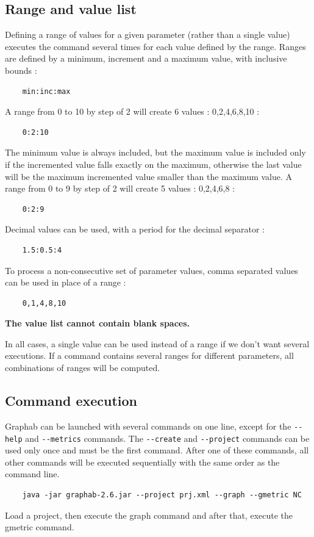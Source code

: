 \documentclass[a4paper,10pt]{report}
\begin{document}
\subsection{Range and value list}
Defining a range of values for a given parameter (rather than a single value) executes the command several times for each value defined by the range.
Ranges are defined by a minimum, increment and a maximum value, with inclusive bounds :
\begin{Verbatim}
	min:inc:max
\end{Verbatim}
A range from 0 to 10 by step of 2 will create 6 values : 0,2,4,6,8,10 :
\begin{Verbatim}
	0:2:10
\end{Verbatim}
The minimum value is always included, but the maximum value is included only if the incremented value falls exactly on the maximum, 
otherwise the last value will be the maximum incremented value smaller than the maximum value.
A range from 0 to 9 by step of 2 will create 5 values : 0,2,4,6,8 :
\begin{Verbatim}
	0:2:9
\end{Verbatim}
Decimal values can be used, with a period for the decimal separator : 
\begin{Verbatim}
	1.5:0.5:4
\end{Verbatim}
To process a non-consecutive set of parameter values, comma separated values can be used in place of a range :
\begin{Verbatim}
	0,1,4,8,10
\end{Verbatim}
\textbf{The value list cannot contain blank spaces.}

In all cases, a single value can be used instead of a range if we don't want several executions.
If a command contains several ranges for different parameters, all combinations of ranges will be computed.

\subsection{Command execution}
Graphab can be launched with several commands on one line, except for the \verb|--help| and \verb|--metrics| commands.
The \verb|--create| and \verb|--project| commands can be used only once and must be the first command. 
After one of these commands, all other commands will be executed sequentially with the same order as the command line.

\begin{Verbatim}
	java -jar graphab-2.6.jar --project prj.xml --graph --gmetric NC  
\end{Verbatim}
Load a project, then execute the graph command and after that, execute the gmetric command.
\end{document}
